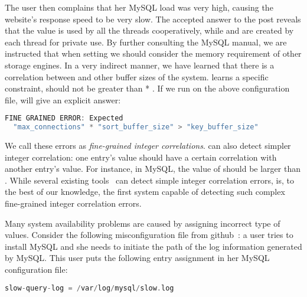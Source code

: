 The user then complains that her MySQL load was very high, 
causing the website's response speed to be very slow.
The accepted answer to the post reveals that the value  
is used by all the threads cooperatively, 
while  and  are created 
by each thread for private use.
By further consulting the MySQL manual, 
we are instructed that when setting  we should consider the memory requirement of other storage engines.
In a very indirect manner, we have learned that there is a correlation
between  and other buffer sizes of the system.
\app learns a specific constraint, \ie
{} should not be greater than
 * .
If we run \app on the above configuration file, \app will give an explicit answer:

\begin{lstlisting}[language=C, xleftmargin=.01\textwidth]
FINE GRAINED ERROR: Expected 
  "max_connections" * "sort_buffer_size" > "key_buffer_size"
\end{lstlisting} 

We call these errors as {\em fine-grained integer correlations}. 
\app can also detect simpler integer correlation: one entry's
value should have a certain correlation with another entry's 
value.
For instance, in MySQL, the value of  
should be larger than .
While several existing tools~\cite{santolucitoCAV, zhang14encore}
can detect simple integer correlation errors,
\app is, to the best of our knowledge, the first system capable of
detecting such complex fine-grained integer correlation errors.

Many system availability problems are caused by 
assigning incorrect type of values. Consider the following  misconfiguration
file from github~\cite{typeerror}:
a user tries to install MySQL and she needs to initiate the path
of the log information generated by MySQL.
This user puts the following entry assignment in her MySQL
configuration file: 

\begin{lstlisting}[language=C, xleftmargin=.01\textwidth]
    slow-query-log = /var/log/mysql/slow.log
\end{lstlisting} 

